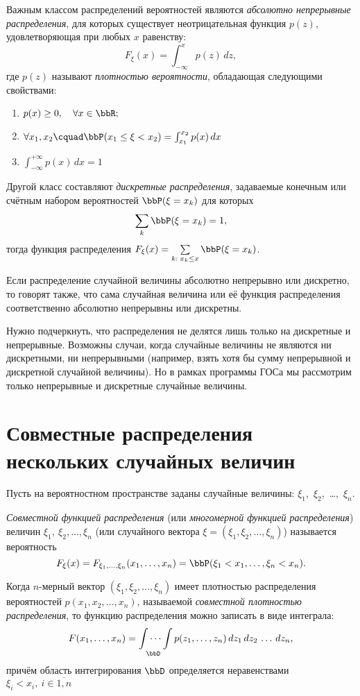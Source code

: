 Важным классом распределений вероятностей являются \textit{абсолютно непрерывные распределения}, для которых существует неотрицательная функция $p(z)$, удовлетворяющая при любых $x$ равенству:
$$F_\xi(x)=\int_{-\infty}^{x}p(z)\,dz,$$ где $p(z)$ называют \textit{плотностью вероятности}, обладающая следующими свойствами:
\begin{enumerate}
\item 
$p(x)\ge 0,\quad \forall x \in \bbR;$ 
\item 
$\forall x_1,x_2\cquad \bbP(x_1\le\xi<x_2)=\int_{x_1}^{x_2}p(x)\,dx$
\item
$\int_{-\infty}^{+\infty}p(x)\,dx=1$
\end{enumerate}

Другой класс составляют \textit{дискретные распределения}, задаваемые конечным или счётным набором вероятностей $\bbP(\xi = x_k)$ для которых
$$
\sum\limits_k \bbP(\xi=x_k)=1,
$$
тогда функция распределения $F_\xi(x)=\sum\limits_{k:\; x_k \le x} \bbP(\xi=x_k)$.

Если распределение случайной величины абсолютно непрерывно или дискретно, то говорят также, что сама случайная величина или её функция распределения соответственно абсолютно непрерывны или дискретны.

Нужно подчеркнуть, что распределения не делятся лишь только на дискретные и непрерывные. Возможны случаи, когда случайные величины не являются ни дискретными, ни непрерывными (например, взять хотя бы сумму непрерывной и дискретной случайной величины). Но в рамках программы ГОСа мы рассмотрим только непрерывные и дискретные случайные величины. 

\section{Совместные распределения нескольких случайных величин}
Пусть на вероятностном пространстве заданы случайные величины: $\xi_1$,~$\xi_2$,~\dots,~$\xi_n$.
\begin{defn}
\textit{Совместной функцией распределения} (или\textit{ многомерной функцией распределения}) величин $\xi_1,~\xi_2,\dots,\xi_n$ (или случайного вектора $\xi = (\xi_1,\xi_2,\dots,\xi_n)$) называется вероятность 
$$
F_\xi(x)=F_{\xi_1,\dots,\xi_n}(x_1,\dots,x_n)=\bbP(\xi_1 < x_1,\dots,\xi_n<x_n).
$$
\end{defn}

Когда $n$-мерный вектор $(\xi_1,\xi_2,\dots,\xi_n)$ имеет плотностью распределения вероятностей $p(x_1,x_2,\dots,x_n)$, называемой \textit{совместной плотностью распределения}, то функцию распределения можно записать в виде интеграла:
$$
F(x_1,\dots,x_n)=\idotsint\limits_\bbD p(z_1,\dots,z_n)\,dz_1\,dz_2\,\dots\,dz_n,
$$
причём область интегрирования $\bbD$ определяется неравенствами $\xi_i<x_i,\ i\in \overline{1,n}$

